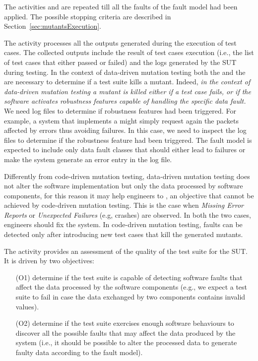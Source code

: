 The activities  and  are repeated till all the faults of the fault model had been applied. The possible stopping criteria are described in Section~\ref{sec:mutantsExecution}. 

The activity  processes all the outputs generated during the execution of test cases.
The collected outputs include the result of test cases execution (i.e., the list of test cases that either passed or failed) and the logs generated by the SUT during testing.
In the context of data-driven mutation testing both the  and the  are necessary to determine if a test suite kills a mutant.
Indeed, \emph{in the context of data-driven mutation testing a mutant is killed either if a test case fails, or if the software activates robustness features capable of handling the specific data fault.}
We need log files to determine if robustness features had been triggered.
For example, a system that implements a  might simply request again the packets affected by errors thus avoiding failures. In this case, we need to inspect the log files to determine if the robustness feature had been triggered.
The fault model is expected to include only data fault classes that should either lead to failures or make the system generate an error entry in the log file.

Differently from code-driven mutation testing, data-driven mutation testing does not alter the software implementation but only the data processed by software components, for this reason it may help engineers to , an objective that cannot be achieved by code-driven mutation testing. 
This is the case when \emph{Missing Error Reports} or \emph{Unexpected Failures }(e.g, crashes) are observed. In both the two cases, engineers should fix the system. In code-driven mutation testing, faults can be detected only after introducing new test cases that kill the generated mutants.

The activity  provides an assessment of the quality of the test suite for the SUT.
It is driven by two objectives:
\begin{itemize}
\item[(O1)] determine if the test suite is capable of detecting software faults that affect the data processed by the software components 
(e.g., we expect a test suite to fail in case the data exchanged by two components contains invalid values).
\item[(O2)] determine if the test suite exercises enough software behaviours to discover all the possible faults that may affect the data produced by the system
(i.e., it should be possible to alter the processed data to generate faulty data according to the fault model). 
\end{itemize}

